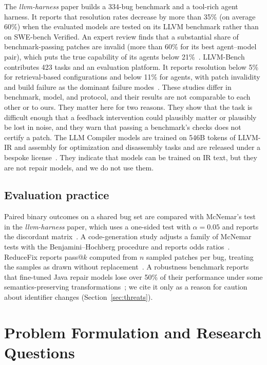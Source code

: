 \documentclass[conference]{IEEEtran}
\begin{document}
The \emph{llvm-harness} paper builds a 334-bug benchmark and a tool-rich agent harness. It reports that resolution rates decrease by more than 35\% (on average 60\%) when the evaluated models are tested on its LLVM benchmark rather than on SWE-bench Verified. An expert review finds that a substantial share of benchmark-passing patches are invalid (more than 60\% for its best agent--model pair), which puts the true capability of its agents below 21\%~\cite{zheng2026harness}. LLVM-Bench contributes 423 tasks and an evaluation platform. It reports resolution below 5\% for retrieval-based configurations and below 11\% for agents, with patch invalidity and build failure as the dominant failure modes~\cite{tian2026llvmbench}. These studies differ in benchmark, model, and protocol, and their results are not comparable to each other or to ours. They matter here for two reasons. They show that the task is difficult enough that a feedback intervention could plausibly matter or plausibly be lost in noise, and they warn that passing a benchmark's checks does not certify a patch. The LLM Compiler models are trained on 546B tokens of LLVM-IR and assembly for optimization and disassembly tasks and are released under a bespoke license~\cite{cummins2024llmcompiler}. They indicate that models can be trained on IR text, but they are not repair models, and we do not use them.

\subsection{Evaluation practice}

Paired binary outcomes on a shared bug set are compared with McNemar's test in the \emph{llvm-harness} paper, which uses a one-sided test with $\alpha{=}0.05$ and reports the discordant matrix~\cite{zheng2026harness,mcnemar1947}. A code-generation study adjusts a family of McNemar tests with the Benjamini--Hochberg procedure and reports odds ratios~\cite{crupi2026slmjudge,benjamini1995fdr}. ReduceFix reports pass@$k$ computed from $n$ sampled patches per bug, treating the samples as drawn without replacement~\cite{yang2026reducefix}. A robustness benchmark reports that fine-tuned Java repair models lose over 50\% of their performance under some semantics-preserving transformations~\cite{rabbi2026hej}; we cite it only as a reason for caution about identifier changes (Section~\ref{sec:threats}).

\section{Problem Formulation and Research Questions}
\label{sec:problem}
\end{document}
